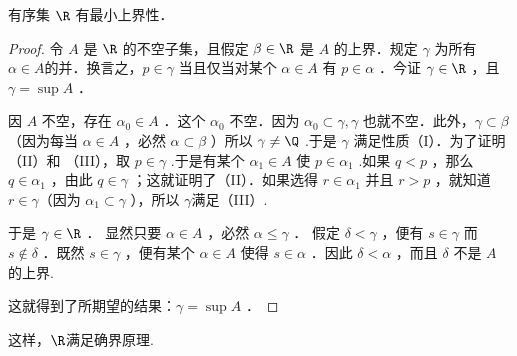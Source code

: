 \begin{theorem}
	有序集 $\R$ 有最小上界性．
\end{theorem}
\begin{proof}
	令 $A$ 是 $\R$ 的不空子集，且假定 $\beta \in \R$ 是 $A$ 的上界．规定 $\gamma$ 为所有 $\alpha \in A$的并．换言之，$p \in \gamma$ 当且仅当对某个 $\alpha \in A$ 有 $p \in \alpha$ ．今证 $\gamma \in \R$ ，且 $\gamma=\sup A$ ．
	
	因 $A$ 不空，存在 $\alpha_0 \in A$ ．这个 $\alpha_0$ 不空．因为 $\alpha_0 \subset \gamma, \gamma$ 也就不空．此外，$\gamma \subset \beta$ （因为每当 $\alpha \in A$ ，必然 $\alpha \subset \beta$ ）所以 $\gamma \neq \Q$ .于是 $\gamma$ 满足性质（I）．为了证明（II）和 （III），取 $p \in \gamma$ .于是有某个 $\alpha_1 \in A$ 使 $p \in \alpha_1$ .如果 $q<p$ ，那么 $q \in \alpha_1$ ，由此 $q \in \gamma$ ；这就证明了（II）．如果选得 $r \in \alpha_1$ 并且 $r>p$ ，就知道 $r \in \gamma$（因为 $\alpha_1 \subset \gamma$ ），所以 $\gamma$满足（III）.
	
	于是 $\gamma \in \R$ ．
	显然只要 $\alpha \in A$ ，必然 $\alpha \leqslant \gamma$ ．
	假定 $\delta<\gamma$ ，便有 $s \in \gamma$ 而 $s \notin \delta$ ．既然 $s \in \gamma$ ，便有某个 $\alpha \in A$ 使得 $s \in \alpha$ ．因此 $\delta<\alpha$ ，而且 $\delta$ 不是 $A$ 的上界.
	
	这就得到了所期望的结果：$\gamma=\sup A$ ．
	
	
\end{proof}
这样，$\R$满足确界原理.

